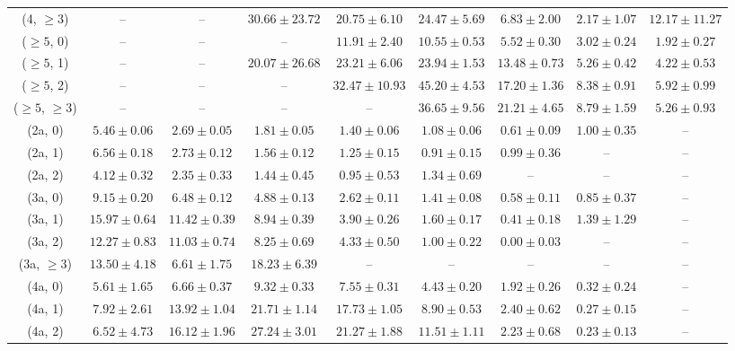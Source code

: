 \begin{table}[h!]
{\begin{tabular}{ccccccccc}
	(4, $\ge3$) & -- & -- & $30.66\pm 23.72$ & $20.75\pm 6.10$ & $24.47\pm 5.69$ & $6.83\pm 2.00$ & $2.17\pm 1.07$ & $12.17\pm 11.27$ \\[0.5ex] 
	($\ge5$, 0) & -- & -- & -- & $11.91\pm 2.40$ & $10.55\pm 0.53$ & $5.52\pm 0.30$ & $3.02\pm 0.24$ & $1.92\pm 0.27$ \\[0.5ex] 
	($\ge5$, 1) & -- & -- & $20.07\pm 26.68$ & $23.21\pm 6.06$ & $23.94\pm 1.53$ & $13.48\pm 0.73$ & $5.26\pm 0.42$ & $4.22\pm 0.53$ \\[0.5ex] 
	($\ge5$, 2) & -- & -- & -- & $32.47\pm 10.93$ & $45.20\pm 4.53$ & $17.20\pm 1.36$ & $8.38\pm 0.91$ & $5.92\pm 0.99$ \\[0.5ex] 
	($\ge5$, $\ge3$) & -- & -- & -- & -- & $36.65\pm 9.56$ & $21.21\pm 4.65$ & $8.79\pm 1.59$ & $5.26\pm 0.93$ \\[0.5ex] 
	(2a, 0) & $5.46\pm 0.06$ & $2.69\pm 0.05$ & $1.81\pm 0.05$ & $1.40\pm 0.06$ & $1.08\pm 0.06$ & $0.61\pm 0.09$ & $1.00\pm 0.35$ & -- \\[0.5ex] 
	(2a, 1) & $6.56\pm 0.18$ & $2.73\pm 0.12$ & $1.56\pm 0.12$ & $1.25\pm 0.15$ & $0.91\pm 0.15$ & $0.99\pm 0.36$ & -- & -- \\[0.5ex] 
	(2a, 2) & $4.12\pm 0.32$ & $2.35\pm 0.33$ & $1.44\pm 0.45$ & $0.95\pm 0.53$ & $1.34\pm 0.69$ & -- & -- & -- \\[0.5ex] 
	(3a, 0) & $9.15\pm 0.20$ & $6.48\pm 0.12$ & $4.88\pm 0.13$ & $2.62\pm 0.11$ & $1.41\pm 0.08$ & $0.58\pm 0.11$ & $0.85\pm 0.37$ & -- \\[0.5ex] 
	(3a, 1) & $15.97\pm 0.64$ & $11.42\pm 0.39$ & $8.94\pm 0.39$ & $3.90\pm 0.26$ & $1.60\pm 0.17$ & $0.41\pm 0.18$ & $1.39\pm 1.29$ & -- \\[0.5ex] 
	(3a, 2) & $12.27\pm 0.83$ & $11.03\pm 0.74$ & $8.25\pm 0.69$ & $4.33\pm 0.50$ & $1.00\pm 0.22$ & $0.00\pm 0.03$ & -- & -- \\[0.5ex] 
	(3a, $\ge3$) & $13.50\pm 4.18$ & $6.61\pm 1.75$ & $18.23\pm 6.39$ & -- & -- & -- & -- & -- \\[0.5ex] 
	(4a, 0) & $5.61\pm 1.65$ & $6.66\pm 0.37$ & $9.32\pm 0.33$ & $7.55\pm 0.31$ & $4.43\pm 0.20$ & $1.92\pm 0.26$ & $0.32\pm 0.24$ & -- \\[0.5ex] 
	(4a, 1) & $7.92\pm 2.61$ & $13.92\pm 1.04$ & $21.71\pm 1.14$ & $17.73\pm 1.05$ & $8.90\pm 0.53$ & $2.40\pm 0.62$ & $0.27\pm 0.15$ & -- \\[0.5ex] 
	(4a, 2) & $6.52\pm 4.73$ & $16.12\pm 1.96$ & $27.24\pm 3.01$ & $21.27\pm 1.88$ & $11.51\pm 1.11$ & $2.23\pm 0.68$ & $0.23\pm 0.13$ & -- \\[0.5ex] 

\end{tabular}}
\end{table}
